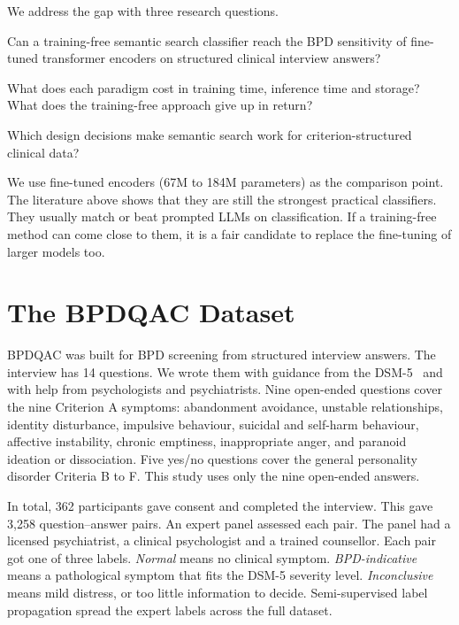 \documentclass[11pt]{article}
\newcommand{\bpdqac}{BPDQAC}
\newcommand{\dsmv}{DSM-5}
\begin{document}
We address the gap with three research questions.
\begin{description}[leftmargin=1.2cm,style=nextline,itemsep=2pt]
  \item[RQ1] Can a training-free semantic search classifier reach the BPD sensitivity of fine-tuned
             transformer encoders on structured clinical interview answers?
  \item[RQ2] What does each paradigm cost in training time, inference time and storage? What does
             the training-free approach give up in return?
  \item[RQ3] Which design decisions make semantic search work for criterion-structured clinical
             data?
\end{description}

We use fine-tuned encoders (67M to 184M parameters) as the comparison point. The literature above
shows that they are still the strongest practical classifiers. They usually match or beat prompted
LLMs on classification. If a training-free method can come close to them, it is a fair candidate
to replace the fine-tuning of larger models too.

\section{The BPDQAC Dataset}\label{sec:dataset}

\bpdqac{} was built for BPD screening from structured interview answers. The interview has 14
questions. We wrote them with guidance from the \dsmv{}~\cite{dsm} and with help from psychologists
and psychiatrists. Nine open-ended questions cover the nine Criterion A symptoms: abandonment
avoidance, unstable relationships, identity disturbance, impulsive behaviour, suicidal and
self-harm behaviour, affective instability, chronic emptiness, inappropriate anger, and paranoid
ideation or dissociation. Five yes/no questions cover the general personality disorder Criteria B
to F. This study uses only the nine open-ended answers.

In total, 362 participants gave consent and completed the interview. This gave 3,258
question--answer pairs. An expert panel assessed each pair. The panel had a licensed psychiatrist, a
clinical psychologist and a trained counsellor. Each pair got one of three labels. \emph{Normal}
means no clinical symptom. \emph{BPD-indicative} means a pathological symptom that fits the \dsmv{}
severity level. \emph{Inconclusive} means mild distress, or too little information to decide.
Semi-supervised label propagation spread the expert labels across the full dataset.
\end{document}
